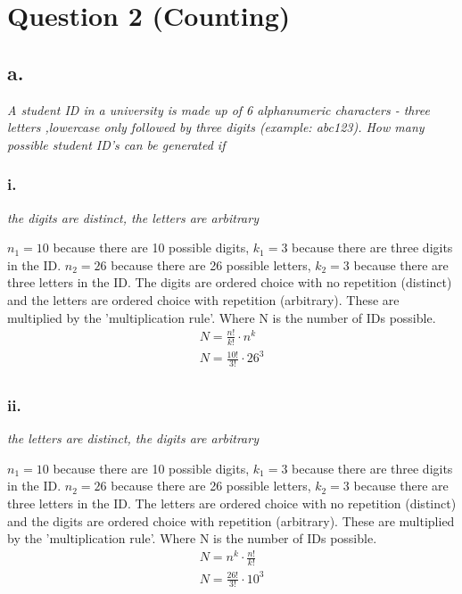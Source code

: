 \documentclass[a4paper, 12pt]{article}
\begin{document}
\section*{Question 2 (Counting)}
\subsection*{a.}
\begin{center} \textit{A student ID in a university is made up of 6 alphanumeric characters - three letters ,lowercase only followed by three digits (example: abc123). How many possible student ID's can be generated if} \end{center}

\subsubsection*{i.}
\begin{center} \textit{the digits are distinct, the letters are arbitrary} \end{center}
$n_1 = 10$ because there are 10 possible digits, $k_1=3$ because there are three digits in the ID.
$n_2 = 26$ because there are 26 possible letters, $k_2=3$ because there are three letters in the ID.
The digits are ordered choice with no repetition (distinct) and the letters are ordered choice with repetition (arbitrary).
These are multiplied by the 'multiplication rule'. Where N is the number of IDs possible.
\begin{align*}
    N = \frac{n!}{k!} \cdot n^k \\
    N = \frac{10!}{3!} \cdot 26^3 \\
\end{align*}

\subsubsection*{ii.}
\begin{center} \textit{the letters are distinct, the digits are arbitrary} \end{center}
$n_1 = 10$ because there are 10 possible digits, $k_1=3$ because there are three digits in the ID.
$n_2 = 26$ because there are 26 possible letters, $k_2=3$ because there are three letters in the ID.
The letters are ordered choice with no repetition (distinct) and the digits are ordered choice with repetition (arbitrary).
These are multiplied by the 'multiplication rule'. Where N is the number of IDs possible.
\begin{align*}
    N = n^k  \cdot \frac{n!}{k!}  \\
    N = \frac{26!}{3!} \cdot 10^3 \\
\end{align*}
\end{document}
